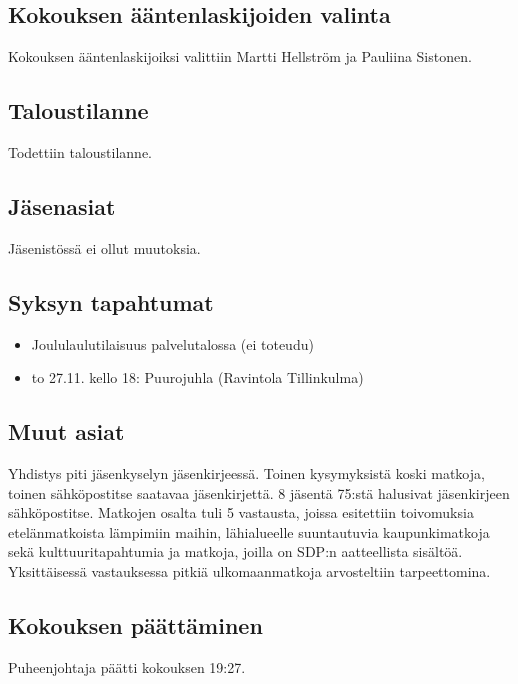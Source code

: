 \documentclass[a4paper,12pt]{article}
\begin{document}
\subsection{Kokouksen ääntenlaskijoiden valinta}
Kokouksen ääntenlaskijoiksi valittiin Martti Hellström ja Pauliina Sistonen.
\subsection{Taloustilanne}
Todettiin taloustilanne.
\subsection{Jäsenasiat}
Jäsenistössä ei ollut muutoksia.
\subsection{Syksyn tapahtumat}
\begin{itemize}
\item{Joululaulutilaisuus palvelutalossa (ei toteudu)}
\item{to 27.11. kello 18: Puurojuhla (Ravintola Tillinkulma)}
\end{itemize}
\subsection{Muut asiat}
Yhdistys piti jäsenkyselyn jäsenkirjeessä. Toinen kysymyksistä koski matkoja, toinen sähköpostitse saatavaa jäsenkirjettä. 8 jäsentä 75:stä halusivat jäsenkirjeen sähköpostitse. Matkojen osalta tuli 5 vastausta, joissa esitettiin toivomuksia etelänmatkoista lämpimiin maihin, lähialueelle suuntautuvia kaupunkimatkoja sekä kulttuuritapahtumia ja matkoja, joilla on SDP:n aatteellista sisältöä. Yksittäisessä vastauksessa pitkiä ulkomaanmatkoja arvosteltiin tarpeettomina.
\subsection{Kokouksen päättäminen}
Puheenjohtaja päätti kokouksen 19:27.
\end{document}
